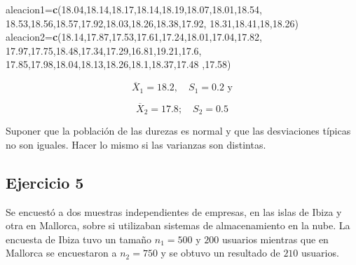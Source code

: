\documentclass[
]{article}
\newenvironment{Shaded}{\begin{snugshade}}{\end{snugshade}}
\newcommand{\DecValTok}[1]{\textcolor[rgb]{0.00,0.00,0.81}{#1}}
\newcommand{\FloatTok}[1]{\textcolor[rgb]{0.00,0.00,0.81}{#1}}
\newcommand{\KeywordTok}[1]{\textcolor[rgb]{0.13,0.29,0.53}{\textbf{#1}}}
\newcommand{\NormalTok}[1]{#1}
\begin{document}
\begin{Shaded}
\begin{Highlighting}[]
\NormalTok{aleacion1=}\KeywordTok{c}\NormalTok{(}\FloatTok{18.04}\NormalTok{,}\FloatTok{18.14}\NormalTok{,}\FloatTok{18.17}\NormalTok{,}\FloatTok{18.14}\NormalTok{,}\FloatTok{18.19}\NormalTok{,}\FloatTok{18.07}\NormalTok{,}\FloatTok{18.01}\NormalTok{,}\FloatTok{18.54}\NormalTok{,}
            \FloatTok{18.53}\NormalTok{,}\FloatTok{18.56}\NormalTok{,}\FloatTok{18.57}\NormalTok{,}\FloatTok{17.92}\NormalTok{,}\FloatTok{18.03}\NormalTok{,}\FloatTok{18.26}\NormalTok{,}\FloatTok{18.38}\NormalTok{,}\FloatTok{17.92}\NormalTok{,}
            \FloatTok{18.31}\NormalTok{,}\FloatTok{18.41}\NormalTok{,}\DecValTok{18}\NormalTok{,}\FloatTok{18.26}\NormalTok{)}
\NormalTok{aleacion2=}\KeywordTok{c}\NormalTok{(}\FloatTok{18.14}\NormalTok{,}\FloatTok{17.87}\NormalTok{,}\FloatTok{17.53}\NormalTok{,}\FloatTok{17.61}\NormalTok{,}\FloatTok{17.24}\NormalTok{,}\FloatTok{18.01}\NormalTok{,}\FloatTok{17.04}\NormalTok{,}\FloatTok{17.82}\NormalTok{,}
            \FloatTok{17.97}\NormalTok{,}\FloatTok{17.75}\NormalTok{,}\FloatTok{18.48}\NormalTok{,}\FloatTok{17.34}\NormalTok{,}\FloatTok{17.29}\NormalTok{,}\FloatTok{16.81}\NormalTok{,}\FloatTok{19.21}\NormalTok{,}\FloatTok{17.6}\NormalTok{,}
            \FloatTok{17.85}\NormalTok{,}\FloatTok{17.98}\NormalTok{,}\FloatTok{18.04}\NormalTok{,}\FloatTok{18.13}\NormalTok{,}\FloatTok{18.26}\NormalTok{,}\FloatTok{18.1}\NormalTok{,}\FloatTok{18.37}\NormalTok{,}\FloatTok{17.48}
\NormalTok{            ,}\FloatTok{17.58}\NormalTok{)}
\end{Highlighting}
\end{Shaded}

\[\overline{X}_{1}=18.2,\quad S_{1}=0.2 \mbox{ y}\]

\[\overline{X}_{2}=17.8;\quad S_{2}=0.5\]

Suponer que la población de las durezas es normal y que las desviaciones
típicas no son iguales. Hacer lo mismo si las varianzas son distintas.

\hypertarget{ejercicio-5}{%
\subsection{Ejercicio 5}\label{ejercicio-5}}

Se encuestó a dos muestras independientes de empresas, en las islas de
Ibiza y otra en Mallorca, sobre si utilizaban sistemas de almacenamiento
en la nube. La encuesta de Ibiza tuvo un tamaño \(n_1=500\) y \(200\)
usuarios mientras que en Mallorca se encuestaron a \(n_2=750\) y se
obtuvo un resultado de \(210\) usuarios.
\end{document}
